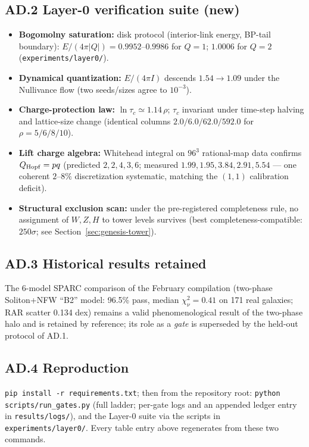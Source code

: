 \subsection*{AD.2 Layer-0 verification suite (new)}
\begin{itemize}
\item \textbf{Bogomolny saturation:} disk protocol (interior-link energy, BP-tail boundary):
$E/(4\pi|Q|)=0.9952$--$0.9986$ for $Q=1$; $1.0006$ for $Q=2$
(\texttt{experiments/layer0/}).
\item \textbf{Dynamical quantization:} $E/(4\pi I)$ descends $1.54\to1.09$ under the
Nullivance flow (two seeds/sizes agree to $10^{-3}$).
\item \textbf{Charge-protection law:} $\ln\tau_c \simeq 1.14\,\rho$; $\tau_c$ invariant
under time-step halving and lattice-size change (identical columns $2.0/6.0/62.0/592.0$
for $\rho=5/6/8/10$).
\item \textbf{Lift charge algebra:} Whitehead integral on $96^3$ rational-map data confirms
$Q_{\rm Hopf}=pq$ (predicted $2,2,4,3,6$; measured $1.99, 1.95, 3.84, 2.91, 5.54$ ---
one coherent $2$--$8\%$ discretization systematic, matching the $(1,1)$ calibration deficit).
\item \textbf{Structural exclusion scan:} under the pre-registered completeness rule, no
assignment of $W,Z,H$ to tower levels survives (best completeness-compatible: $250\sigma$;
see Section~\ref{sec:genesis-tower}).
\end{itemize}

\subsection*{AD.3 Historical results retained}
The 6-model SPARC comparison of the February compilation (two-phase Soliton+NFW ``B2''
model: 96.5\% pass, median $\chi^2_\nu=0.41$ on 171 real galaxies; RAR scatter 0.134 dex)
remains a valid phenomenological result of the two-phase halo and is retained by reference;
its role as a \emph{gate} is superseded by the held-out protocol of AD.1.

\subsection*{AD.4 Reproduction}
\texttt{pip install -r requirements.txt}; then from the repository root:
\texttt{python scripts/\allowbreak run\_\allowbreak gates.py} (full ladder; per-gate logs and an appended ledger
entry in \texttt{results/logs/}), and the Layer-0 suite via the scripts in
\texttt{experiments/layer0/}. Every table entry above regenerates from these two commands.
